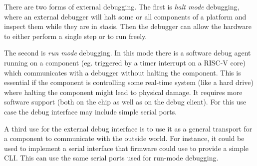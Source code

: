 \documentclass{article}
\begin{document}
There are two forms of external debugging. The first is \emph{halt mode}
debugging, where an external debugger will halt some or all components of a
platform and inspect them while they are in stasis. Then the debugger can allow
the hardware to either perform a single step or to run freely.

The second is \emph{run mode} debugging.  In this mode there is a software
debug agent running on a component (eg.  triggered by a timer interrupt on a
RISC-V core) which communicates with a debugger without halting the component.
This is essential if the component is controlling some real-time system (like a
hard drive) where halting the component might lead to physical damage. It
requires more software support (both on the chip as well as on the debug
client).  For this use case the debug interface may include simple serial
ports.

A third use for the external debug interface is to use it as a general
transport for a component to communicate with the outside world. For instance,
it could be used to implement a serial interface that firmware could use to
provide a simple CLI. This can use the same serial ports used for run-mode
debugging.
\end{document}
